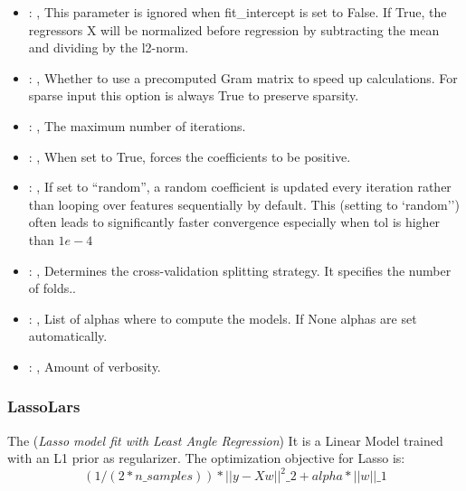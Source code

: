 \begin{itemize}
    \item {}: , 
      This parameter is ignored when fit\_intercept is set to False. If True,
      the regressors X will be normalized before regression by subtracting the mean and
      dividing by the l2-norm.

    \item {}: , 
      Whether to use a precomputed Gram matrix to speed up calculations.
      For sparse input this option is always True to preserve sparsity.

    \item {}: , 
      The maximum number of iterations.

    \item {}: , 
      When set to True, forces the coefficients to be positive.

    \item {}: , 
      If set to ``random'', a random coefficient is updated every iteration
      rather than looping over features sequentially by default. This (setting to `random'')
      often leads to significantly faster convergence especially when tol is higher than $1e-4$

    \item {}: , 
      Determines the cross-validation splitting strategy.
      It specifies the number of folds..

    \item {}: , 
      List of alphas where to compute the models. If None alphas
      are set automatically.

    \item {}: , 
      Amount of verbosity.
  \end{itemize}


\subsubsection{LassoLars}
  The  (\textit{Lasso model fit with Least Angle Regression})
  It is a Linear Model trained with an L1 prior as regularizer.                         The
  optimization objective for Lasso is:                         \begin{equation}
  (1 / (2 * n\_samples)) * ||y - Xw||^2\_2 + alpha * ||w||\_1                         \end{equation}

